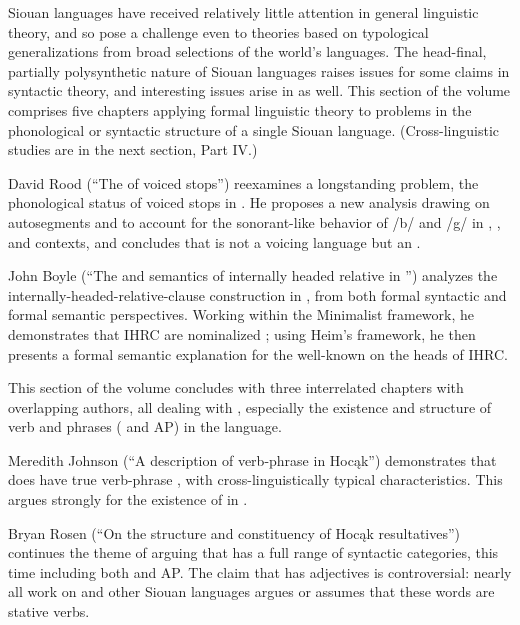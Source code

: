 \begin{refsection}

Siouan languages have received relatively little attention in general linguistic theory, and so pose a challenge even to theories based on typological generalizations from broad selections of the world's languages. The head-final, partially polysynthetic nature of Siouan languages raises issues for some claims in syntactic theory, and interesting issues arise in  as well. This section of the volume comprises five chapters applying formal linguistic theory to problems in the phonological or syntactic structure of a single Siouan language. (Cross-linguistic studies are in the next section, Part IV.)

David Rood (``The  of  voiced stops'') reexamines a longstanding problem, the phonological status of voiced stops in . He proposes a new analysis drawing on autosegments and  to account for the sonorant-like behavior of /b/ and /g/ in , , and  contexts, and concludes that  is not a voicing language but an . 

John Boyle (``The  and semantics of internally headed relative  in '') analyzes the internally-headed-relative-clause construction in , from both formal syntactic and formal semantic perspectives. Working within the Minimalist framework, he demonstrates that  IHRC are nominalized ; using Heim's framework, he then presents a formal semantic explanation for the well-known  on the heads of IHRC. 

This section of the volume concludes with three interrelated chapters with overlapping authors, all dealing with  , especially the existence and structure of verb and  phrases ( and AP) in the language.

Meredith Johnson (``A description of verb-phrase  in Hoc\k{a}k'') demonstrates that  does have true verb-phrase , with cross-linguistically typical characteristics. This argues strongly for the existence of  in .

Bryan Rosen (``On the structure and constituency of Hoc\k{a}k resultatives'') continues the theme of arguing that  has a full range of syntactic categories, this time including both  and AP. The claim that  has adjectives is controversial: nearly all work on  and other Siouan languages argues or assumes that these words are stative verbs.


\end{refsection}
